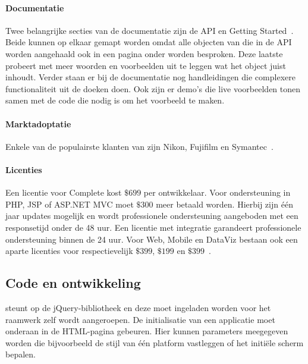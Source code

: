 \paragraph{Documentatie}
Twee belangrijke secties van de documentatie zijn de API en Getting Started~\cite{Telerikd}.
Beide kunnen op elkaar gemapt worden omdat alle objecten van \kendo{} die in de API worden aangehaald ook in een pagina onder  worden besproken.
Deze laatste probeert met meer woorden en voorbeelden uit te leggen wat het object juist inhoudt.
Verder staan er bij de documentatie nog handleidingen die complexere functionaliteit uit de doeken doen.
Ook zijn er demo's die live voorbeelden tonen samen met de code die nodig is om het voorbeeld te maken.

\paragraph{Marktadoptatie}
Enkele van de populairste klanten van \kendo{} zijn Nikon,  Fujifilm en Symantec~\cite{Telerike}.

\paragraph{Licenties}
Een licentie voor \kendo{} Complete kost $\$699$ per ontwikkelaar.
Voor  ondersteuning in PHP,  JSP of ASP.NET MVC moet $\$300$ meer betaald worden.
Hierbij zijn één jaar updates mogelijk en wordt professionele ondersteuning aangeboden met een responsetijd onder de 48 uur.
Een licentie met  integratie garandeert professionele ondersteuning binnen de 24 uur.
Voor \kendo{} Web,  Mobile en DataViz bestaan ook een aparte licenties voor respectievelijk $\$399$,  $\$199$ en $\$399$~\cite{Telerike}.

\subsection{Code en ontwikkeling}
\kendo{} steunt op de jQuery-bibliotheek en deze moet ingeladen worden voor het \kendo{} raamwerk zelf wordt aangeroepen.
De initialisatie van een applicatie moet onderaan in de HTML-pagina gebeuren.	
Hier kunnen parameters meegegeven worden die bijvoorbeeld de stijl van één platform vastleggen of het initiële scherm bepalen.


